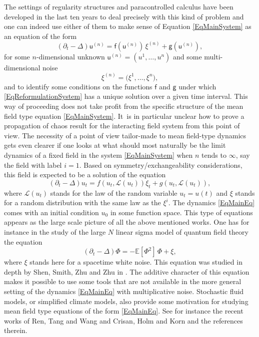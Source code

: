 \documentclass[10pt]{amsart}
\theoremstyle{definition}
\newcommand\bbE{\mathbb{E}}
\newcommand{\mcL}{\mathcal{L}}
\begin{document}
The settings of regularity structures and paracontrolled calculus have been developed in the last ten years to deal precisely with this kind of problem and one can indeed use either of them to make sense of Equation \eqref{EqMainSystem} as an equation of the form\vspace*{-3pt}
\begin{equation} \label{EqReformulationSystem}
(\partial_t-\Delta) \mathsf{u}^{(n)} = \mathsf{f}(\mathsf{u}^{(n)})\,\xi^{(n)} + \mathsf{g}(\mathsf{u}^{(n)}),
\end{equation}
for some $n$-dimensional unknown $\mathsf{u}^{(n)} = (u^1,\dots,u^n)$ and some multi-dimensional noise\vspace*{-5pt}
\[
\xi^{(n)} = \bigl(\xi^1,\dots,\xi^n\bigr),
\]
and to identify some conditions on the functions $\mathsf{f}$ and $\mathsf{g}$ under which \eqref{EqReformulationSystem} has a unique solution over a given time interval. This way of proceeding does not take profit from the specific structure of the mean field type equation \eqref{EqMainSystem}. It~is in particular unclear how to prove a propagation of chaos result for the interacting field system from this point of view. The necessity of a point of view tailor-made to mean field-type dynamics gets even clearer if one looks at what should most naturally be the limit dynamics of a fixed field in the system \eqref{EqMainSystem} when $n$ tends to $\infty$, say the field with label $i=1$. Based on symmetry/exchangeability considerations, this field is expected to be a solution of the equation\vspace*{-3pt}
\begin{equation} \label{EqMainEq}
(\partial_t-\Delta)u_t = f(u_t, \mcL(u_t)) \xi_t + g(u_t, \mcL(u_t)),
\end{equation}
where $\mcL(u_t)$ stands for the law of the random variable $u_t=u(t)$ and $\xi$ stands for a random distribution with the same law as the $\xi^i$. The dynamics \eqref{EqMainEq} comes with an initial condition $u_0$ in some function space. This type of equations appears as the large scale picture of all the above mentioned works. One has for instance in the study of the large $N$ linear sigma model of quantum field theory the equation\vspace*{-3pt}
\begin{equation} \label{EqLinearSigma}
(\partial_t-\Delta) \Phi = -\bbE[\Phi^2] \, \Phi + \xi,
\end{equation}
where $\xi$ stands here for a spacetime white noise. This equation was studied in depth by Shen, Smith, Zhu and Zhu in \cite{SZZ22-3D, SSZZ22}. The additive character of this equation makes it possible to use some tools that are not available in the more general setting of the dynamics \eqref{EqMainEq} with multiplicative noise. Stochastic fluid models, or simplified climate models, also provide some motivation for studying mean field type equations of the form \eqref{EqMainEq}. See for instance the recent works of Ren, Tang and Wang \cite{RTW} and Crisan, Holm and Korn \cite{CHK} and the references therein.
\end{document}
